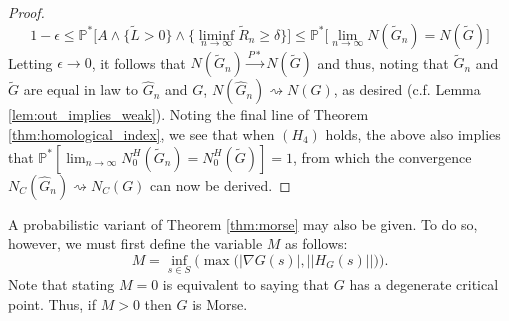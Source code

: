 \documentclass[11pt]{article}
\newcommand{\1}{\mathbf{1}}
\theoremstyle{definition}
\theoremstyle{remark}
\begin{document}
\begin{proof}
    \begin{equation}\nonumber
        1-\epsilon \leq \mathbb{P}^{*}\bigg[A \land \big\{\tilde{L}>0\big\} \land \big\{\liminf_{n\rightarrow\infty}\tilde{R}_n \geq \delta \big\}\bigg] \leq \mathbb{P}^*\bigg[\lim_{n\rightarrow \infty}N(\tilde{G}_n)= N(\tilde{G})\bigg]
    \end{equation}
    Letting $\epsilon\rightarrow 0$, it follows that $N(\tilde{G}_n)\xrightarrow{P*}N(\tilde{G})$ and thus, noting that $\tilde{G}_n$ and $\tilde{G}$ are equal in law to $\hat{G}_n$ and $G$, $N(\hat{G}_n)\rightsquigarrow N(G)$, as desired (c.f. Lemma \ref{lem:out_implies_weak}). Noting the final line of Theorem \ref{thm:homological_index}, we see that when $(H_4)$ holds, the above also implies that $\mathbb{P}^*[\lim_{n\rightarrow\infty}N_0^H(\tilde{G}_n)=N_0^H(\tilde{G})]=1$, from which the convergence $N_C(\hat{G}_n)\rightsquigarrow N_C(G)$ can now be derived.
\end{proof}

A probabilistic variant of Theorem \ref{thm:morse} may also be given. To do so, however, we must first define the variable $M$ as follows:
\begin{equation}\nonumber
    M=\inf_{s \in S}\bigg(\max\big(|\nabla G(s)|, ||H_G(s)||\big)\bigg).
\end{equation}
Note that stating $M=0$ is equivalent to saying that $G$ has a degenerate critical point.  Thus, if $M>0$ then $G$ is Morse.
\end{document}
